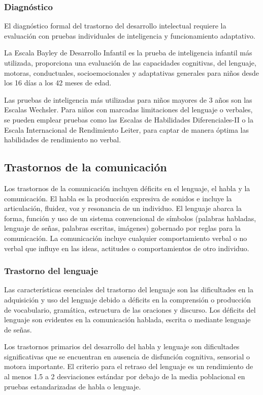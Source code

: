 \documentclass[11pt,letterpaper]{report}
\begin{document}
\subsubsection{Diagnóstico}
El diagnóstico formal del trastorno del desarrollo intelectual requiere la
evaluación con pruebas individuales de inteligencia y funcionamiento
adaptativo.

La Escala Bayley de Desarrollo Infantil es la prueba de inteligencia infantil
más utilizada, proporciona una evaluación de las capacidades cognitivas, del
lenguaje, motoras, conductuales, socioemocionales y adaptativas generales para
niños desde los 16 días a los 42 meses de edad. \cite{Nelson56}

Las pruebas de inteligencia más utilizadas para niños mayores de 3 años son las
Escalas Wechsler. Para niños con marcadas limitaciones del lenguaje o verbales,
se pueden emplear pruebas como las Escalas de Habilidades Diferenciales-II o la
Escala Internacional de Rendimiento Leiter, para captar de manera óptima las
habilidades de rendimiento no verbal. \cite{Nelson56}

\subsection{Trastornos de la comunicación}
Los trastornos de la comunicación incluyen déficits en el lenguaje, el habla y
la comunicación. El habla es la producción expresiva de sonidos e incluye la
articulación, fluidez, voz y resonancia de un individuo. El lenguaje abarca la
forma, función y uso de un sistema convencional de símbolos (palabras habladas,
lenguaje de señas, palabras escritas, imágenes) gobernado por reglas para la
comunicación. La comunicación incluye cualquier comportamiento verbal o no
verbal que influye en las ideas, actitudes o comportamientos de otro individuo.
\cite{DSM5TR}

\subsubsection{Trastorno del lenguaje}
Las características esenciales del trastorno del lenguaje son las dificultades
en la adquisición y uso del lenguaje debido a déficits en la comprensión o
producción de vocabulario, gramática, estructura de las oraciones y discurso.
Los déficits del lenguaje son evidentes en la comunicación hablada, escrita o
mediante lenguaje de señas. \cite{DSM5TR}

Los trastornos primarios del desarrollo del habla y lenguaje son dificultades
significativas que se encuentran en ausencia de disfunción cognitiva, sensorial
o motora importante. El criterio para el retraso del lenguaje es un rendimiento
de al menos 1.5 a 2 desviaciones estándar por debajo de la media poblacional en
pruebas estandarizadas de habla o lenguaje. \cite{Feldman44}
\end{document}
